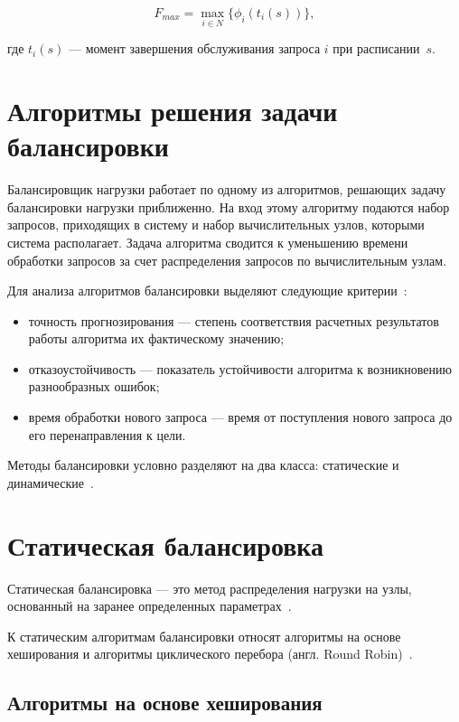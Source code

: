 \begin{equation}
	\label{eq:main_task}	
	F_{max} =   \max_{i \in N} \{\phi_i(t_i(s))\}, 
\end{equation}

где $t_i(s)$ --- момент завершения обслуживания запроса $i$ при расписании~$s$.

\section{Алгоритмы решения задачи балансировки}

Балансировщик нагрузки работает по одному из алгоритмов, решающих задачу балансировки нагрузки приближенно.
На вход этому алгоритму подаются набор запросов, приходящих в систему и набор вычислительных узлов, которыми система располагает.
Задача алгоритма сводится к уменьшению времени обработки запросов за счет распределения запросов по вычислительным узлам.

Для анализа алгоритмов балансировки выделяют следующие критерии~\cite{com_analysis}:
\begin{itemize}
	\item точность прогнозирования --- степень соответствия расчетных результатов работы алгоритма их фактическому значению;  
	\item отказоустойчивость --- показатель устойчивости алгоритма к возникновению разнообразных ошибок;
	\item время обработки нового запроса --- время от поступления нового запроса до его перенаправления к цели.
\end{itemize}

Методы балансировки условно разделяют на два класса: статические и динамические~\cite{drr, com_analysis, rate_comp}. 

\newpage

\section{Статическая балансировка}

Статическая балансировка --- это метод распределения нагрузки на узлы, основанный на заранее определенных параметрах~\cite{com_analysis, intuit}.

К статическим алгоритмам балансировки относят алгоритмы на основе хеширования и алгоритмы циклического перебора (англ. Round Robin)~\mbox{\cite{nginx, aws, haproxy, part_algos, com_analysis}}.

\subsection{Алгоритмы на основе хеширования}

